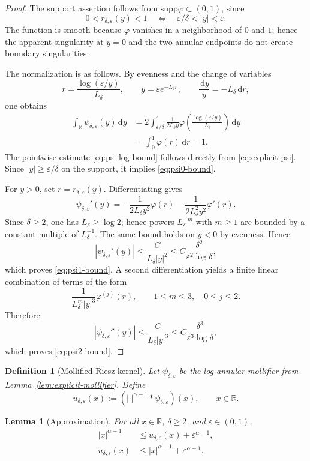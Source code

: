 \documentclass[11pt]{article}
\newtheorem{lemma}[theorem]{Lemma}
\newtheorem{definition}[theorem]{Definition}
\newcommand{\R}{\mathbb{R}}
\newcommand{\1}{\mathbf{1}}
\newcommand{\dd}{\,\mathrm{d}}
\newcommand{\eps}{\varepsilon}
\newcommand{\supp}{\mathrm{supp}}
\begin{document}
\begin{proof}
The support assertion follows from $\supp\varphi\subset(0,1)$, since
\[
  0<r_{\delta,\eps}(y)<1
  \quad\Longleftrightarrow\quad
  \eps/\delta<|y|<\eps.
\]
The function is smooth because $\varphi$ vanishes in a neighborhood of $0$ and $1$; hence the apparent singularity at $y=0$ and the two annular endpoints do not create boundary singularities.

The normalization is as follows. By evenness and the change of variables
\[
  r=\frac{\log(\eps/y)}{L_\delta},
  \qquad y=\eps e^{-L_\delta r},
  \qquad \frac{\dd y}{y}=-L_\delta\dd r,
\]
one obtains
\[
\begin{aligned}
\int_\R\psi_{\delta,\eps}(y)\dd y
&=2\int_{\eps/\delta}^{\eps}
\frac{1}{2L_\delta y}\varphi\!\left(\frac{\log(\eps/y)}{L_\delta}\right)\dd y \\
&=\int_0^1\varphi(r)\dd r=1.
\end{aligned}
\]
The pointwise estimate \eqref{eq:psi-log-bound} follows directly from \eqref{eq:explicit-psi}. Since $|y|\ge\eps/\delta$ on the support, it implies \eqref{eq:psi0-bound}.

For $y>0$, set $r=r_{\delta,\eps}(y)$. Differentiating gives
\[
  \psi_{\delta,\eps}'(y)
  =-\frac{1}{2L_\delta y^2}\varphi(r)
   -\frac{1}{2L_\delta^2y^2}\varphi'(r).
\]
Since $\delta\ge2$, one has $L_\delta\ge\log2$; hence powers $L_\delta^{-m}$ with $m\ge1$ are bounded by a constant multiple of $L_\delta^{-1}$. The same bound holds on $y<0$ by evenness. Hence
\[
  |\psi_{\delta,\eps}'(y)|
  \le \frac{C}{L_\delta |y|^2}
  \le C\frac{\delta^2}{\eps^2\log\delta},
\]
which proves \eqref{eq:psi1-bound}. A second differentiation yields a finite linear combination of terms of the form
\[
  \frac{1}{L_\delta^m |y|^3}\varphi^{(j)}(r),
  \qquad 1\le m\le3,\quad 0\le j\le2.
\]
Therefore
\[
  |\psi_{\delta,\eps}''(y)|
  \le \frac{C}{L_\delta |y|^3}
  \le C\frac{\delta^3}{\eps^3\log\delta},
\]
which proves \eqref{eq:psi2-bound}.
\end{proof}

\begin{definition}[Mollified Riesz kernel]\label{def:mollifier-delta}
Let $\psi_{\delta,\eps}$ be the log-annular mollifier from Lemma~\ref{lem:explicit-mollifier}. Define
\[
  u_{\delta,\eps}(x):=(|\cdot|^{\alpha-1}*\psi_{\delta,\eps})(x),
  \qquad x\in\R.
\]
\end{definition}

\begin{lemma}[Approximation]\label{lem:approx}
For all $x\in\R$, $\delta\ge2$, and $\eps\in(0,1)$,
\begin{align}
  |x|^{\alpha-1}&\le u_{\delta,\eps}(x)+\eps^{\alpha-1}, \label{eq:approx-lower}\\
  u_{\delta,\eps}(x)&\le |x|^{\alpha-1}+\eps^{\alpha-1}. \label{eq:approx-upper}
\end{align}
\end{lemma}
\end{document}
